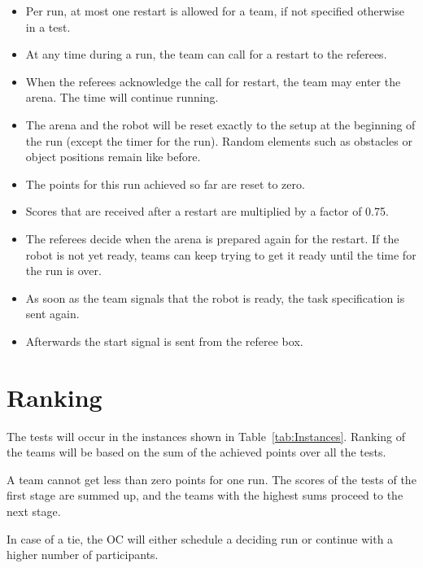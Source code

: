 \begin{itemize}

	\item Per run, at most one restart is allowed for a team, if not specified otherwise in a test.
	\item At any time during a run, the team can call for a restart to the referees.
	\item When the referees acknowledge the call for restart, the team may enter the arena. The time will continue running.
	\item The arena and the robot will be reset exactly to the setup at the beginning of the run (except the timer for the run). Random elements such as obstacles or object positions remain like before.
	\item The points for this run achieved so far are reset to zero.
	\item Scores that are received after a restart are multiplied by a factor of 0.75.
	\item The referees decide when the arena is prepared again for the restart. If the robot is not yet ready, teams can keep trying to get it ready until the time for the run is over.
	\item As soon as the team signals that the robot is ready, the task specification is sent again.
	\item Afterwards the start signal is sent from the referee box.

\end{itemize}


\section{Ranking}
The tests will occur in the instances shown in Table~\ref{tab:Instances}. Ranking of the teams will be based on the sum of the achieved points over all the tests.

A team cannot get less than zero points for one run.
The scores of the tests of the first stage are summed up, and the teams with the highest sums proceed to the next stage.

In case of a tie, the OC will either schedule a deciding run or continue with a higher number of participants.

\renewcommand{\arraystretch}{1.1}
\newcommand{\R}[2]{
	\begin{turn}{90}
		\begin{minipage}[][1em][c]{#2}
		#1
	  \end{minipage}
	\end{turn}
}

